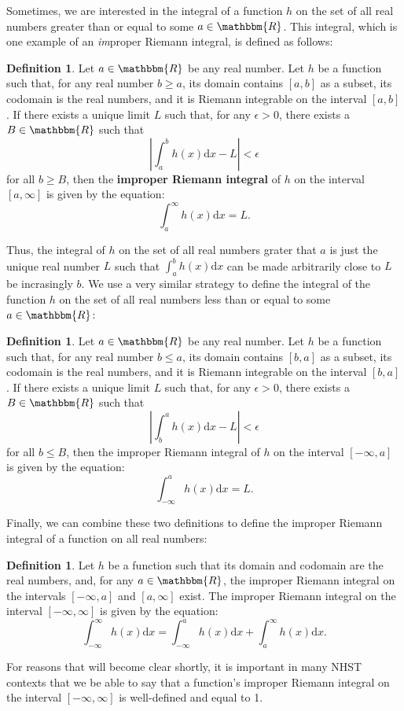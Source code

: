 \documentclass[11pt]{article}
\theoremstyle{definition}
\newtheorem{definition}[theorem]{Definition}
\theoremstyle{remark}
\begin{document}
Sometimes, we are interested in the integral of a function $h$ on the set of all real numbers greater than or equal to some $a\in\mathbbm{R}$. This integral, which is one example of an \textit{im}proper Riemann integral, is defined as follows:
\begin{definition}
    Let $a\in\mathbbm{R}$ be any real number. Let $h$ be a function such that, for any real number $b\geq a$, its domain contains $[a,b]$ as a subset, its codomain is the real numbers, and it is Riemann integrable on the interval $[a,b]$. If there exists a unique limit $L$ such that, for any $\epsilon>0$, there exists a $B\in\mathbbm{R}$ such that
    $$\left|\int_{a}^{b}h(x)\textrm{d}x-L\right|<\epsilon$$
    for all $b\geq B$, then the \textbf{improper Riemann integral} of $h$ on the interval $[a,\infty]$ is given by the equation:
    $$\int_{a}^{\infty}h(x)\textrm{d}x=L.$$
\end{definition}
\noindent
Thus, the integral of $h$ on the set of all real numbers grater that $a$ is just the unique real number $L$ such that $\int_{a}^{b}h(x)\textrm{d}x$ can be made arbitrarily close to $L$ be incrasingly $b$. We use a very similar strategy to define the integral of the function $h$ on the set of all real numbers less than or equal to some $a\in\mathbbm{R}$:
\begin{definition}
    Let $a\in\mathbbm{R}$ be any real number. Let $h$ be a function such that, for any real number $b\leq a$, its domain contains $[b,a]$ as a subset, its codomain is the real numbers, and it is Riemann integrable on the interval $[b,a]$. If there exists a unique limit $L$ such that, for any $\epsilon>0$, there exists a $B\in\mathbbm{R}$ such that
    $$\left|\int_{b}^{a}h(x)\textrm{d}x-L\right|<\epsilon$$
    for all $b\leq B$, then the improper Riemann integral of $h$ on the interval $[-\infty,a]$ is given by the equation:
    $$\int_{-\infty}^{a}h(x)\textrm{d}x=L.$$
\end{definition}
\noindent
Finally, we can combine these two definitions to define the improper Riemann integral of a function on all real numbers:
\begin{definition}
    Let $h$ be a function such that its domain and codomain are the real numbers, and, for any $a\in\mathbbm{R}$, the improper Riemann integral on the intervals $[-\infty,a]$ and $[a,\infty]$ exist. The improper Riemann integral on the interval $[-\infty,\infty]$ is given by the equation:
    $$\int_{-\infty}^{\infty}h(x)\textrm{d}x = \int_{-\infty}^{a}h(x)\textrm{d}x + \int_{a}^{\infty}h(x)\textrm{d}x.$$
\end{definition}
\noindent
For reasons that will become clear shortly, it is important in many NHST contexts that we be able to say that a function's improper Riemann integral on the interval $[-\infty,\infty]$ is well-defined and equal to 1.\par 
\end{document}
